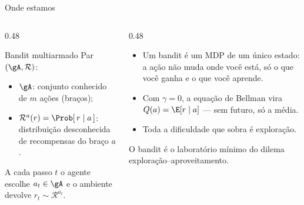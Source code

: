 \documentclass[aspectratio=169, 11pt]{beamer}
\begin{document}
\begin{frame}{Onde estamos}
  \begin{columns}[T]
    \begin{column}{0.48\textwidth}
      \begin{defbox}{Bandit multiarmado}
        Par $(\gA, \mathcal{R})$:
        \begin{itemize}\setlength{\itemsep}{0.2ex}
          \item $\gA$: conjunto \alert{conhecido} de $m$ ações (braços);
          \item $\mathcal{R}^a(r) = \Prob[\,r \mid a\,]$: distribuição
                \alert{desconhecida} de recompensas do braço $a$.
        \end{itemize}
        A cada passo $t$ o agente escolhe $a_t \in \gA$ e o ambiente
        devolve $r_t \sim \mathcal{R}^{a_t}$.
      \end{defbox}
    \end{column}
    \begin{column}{0.48\textwidth}
      \begin{itemize}
        \item Um bandit é um MDP de \alert{um único estado}: a ação não
              muda onde você está, só o que você ganha e o que você
              aprende.
        \item Com $\gamma=0$, a equação de Bellman vira
              $Q(a) = \E[r \mid a]$ — sem futuro, só a média.
        \item Toda a dificuldade que sobra é \alert{exploração}.
      \end{itemize}

      \begin{ideiabox}
        O bandit é o laboratório mínimo do dilema
        exploração--aproveitamento.
      \end{ideiabox}
    \end{column}
  \end{columns}
\end{frame}
\end{document}
